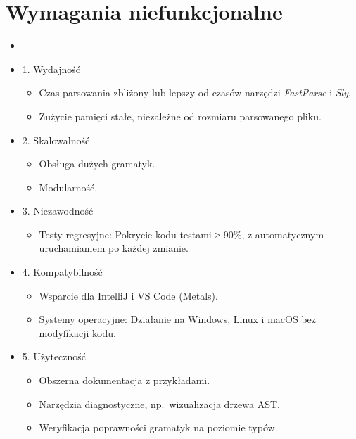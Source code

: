 \section{Wymagania niefunkcjonalne}
\label{sec:wymagania-niefunkcjonalne}

\begin{itemize}

    \item \item 1. Wydajność
    \begin{itemize}
        \item Czas parsowania zbliżony lub lepszy od czasów narzędzi \textit{FastParse} i \textit{Sly}.
        \item Zużycie pamięci stałe, niezależne od rozmiaru parsowanego pliku.
    \end{itemize}

    \item 2. Skalowalność
    \begin{itemize}
        \item Obsługa dużych gramatyk.
        \item Modularność.
    \end{itemize}

    \item 3. Niezawodność
    \begin{itemize}
        \item Testy regresyjne: Pokrycie kodu testami ≥ 90\%, z automatycznym uruchamianiem po każdej zmianie.
    \end{itemize}

    \item 4. Kompatybilność
    \begin{itemize}
        \item Wsparcie dla IntelliJ i VS Code (Metals).
        \item Systemy operacyjne: Działanie na Windows, Linux i macOS bez modyfikacji kodu.
    \end{itemize}

    \item 5. Użyteczność
    \begin{itemize}
        \item Obszerna dokumentacja z przykładami.
        \item Narzędzia diagnostyczne, np.\ wizualizacja drzewa AST\@.
        \item Weryfikacja poprawności gramatyk na poziomie typów.
    \end{itemize}

\end{itemize}


